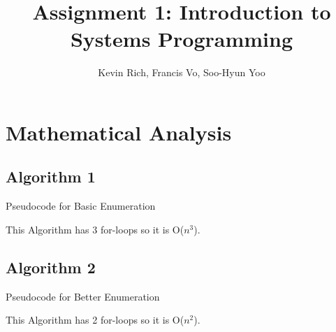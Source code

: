 \documentclass[a4paper,10pt]{article}
\title{Assignment 1: Introduction to Systems Programming}
\author{Kevin Rich, Francis Vo, Soo-Hyun Yoo}
\begin{document}
	\maketitle

	\section{Mathematical Analysis}
		\subsection{Algorithm 1}
			\begin{algorithm}[H]
				\SetAlgoLined
				\LinesNumbered
				\DontPrintSemicolon
			\caption{Pseudocode for Basic Enumeration}
			\end{algorithm}
			This Algorithm has 3 for-loops so it is O($n^3$).
		\subsection{Algorithm 2}
			\begin{algorithm}[H]
				\SetAlgoLined
				\LinesNumbered
				\DontPrintSemicolon
			\caption{Pseudocode for Better Enumeration}
			\end{algorithm}
			This Algorithm has 2 for-loops so it is O($n^2$).
\end{document}
